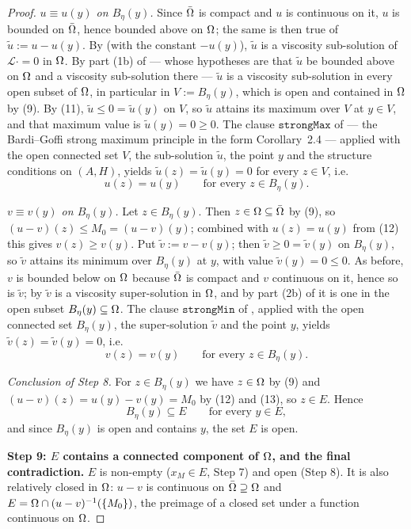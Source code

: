 \begin{proof}
\emph{$u\equiv u(y)$ on $B_\eta(y)$.} Since $\bar{\Omega}$ is compact and $u$ is continuous on it,
$u$ is bounded on $\bar{\Omega}$, hence bounded above on $\Omega$; the same is then true of
$\tilde u:=u-u(y)$. By  (with the constant $-u(y)$),
$\tilde u$ is a viscosity sub-solution of $\mathcal L\cdot=0$ in $\Omega$. By part (1b) of
 --- whose hypotheses are that $\tilde u$ be bounded above on
$\Omega$ and a viscosity sub-solution there --- $\tilde u$ is a viscosity sub-solution in every
open subset of $\Omega$, in particular in $V:=B_\eta(y)$, which is open and contained in $\Omega$
by (9). By (11), $\tilde u\le0=\tilde u(y)$ on $V$, so $\tilde u$ attains its maximum over
$V$ at $y\in V$, and that maximum value is $\tilde u(y)=0\ge0$. The clause
$\mathtt{strongMax}$ of  --- the Bardi--Goffi strong maximum principle
in the form Corollary~2.4 --- applied with the open connected set $V$, the sub-solution
$\tilde u$, the point $y$ and the structure conditions on $(A,H)$, yields
$\tilde u(z)=\tilde u(y)=0$ for every $z\in V$, i.e.
\[
 u(z)=u(y)\qquad\text{for every } z\in B_\eta(y). \tag{12}
\]

\emph{$v\equiv v(y)$ on $B_\eta(y)$.} Let $z\in B_\eta(y)$. Then $z\in\Omega\subseteq\bar{\Omega}$ by
(9), so $(u-v)(z)\le M_0=(u-v)(y)$; combined with $u(z)=u(y)$ from (12) this gives
$v(z)\ge v(y)$. Put $\tilde v:=v-v(y)$; then $\tilde v\ge0=\tilde v(y)$ on $B_\eta(y)$, so
$\tilde v$ attains its minimum over $B_\eta(y)$ at $y$, with value $\tilde v(y)=0\le0$.
As before, $v$ is bounded below on $\Omega$ because $\bar{\Omega}$ is compact and $v$ continuous on
it, hence so is $\tilde v$; by  $\tilde v$ is a viscosity
super-solution in $\Omega$, and by part (2b) of  it is one in the
open subset $B_\eta(y)\subseteq\Omega$. The clause $\mathtt{strongMin}$ of
, applied with the open connected set $B_\eta(y)$, the super-solution
$\tilde v$ and the point $y$, yields $\tilde v(z)=\tilde v(y)=0$, i.e.
\[
 v(z)=v(y)\qquad\text{for every } z\in B_\eta(y). \tag{13}
\]

\emph{Conclusion of Step 8.} For $z\in B_\eta(y)$ we have $z\in\Omega$ by (9) and
$(u-v)(z)=u(y)-v(y)=M_0$ by (12) and (13), so $z\in E$. Hence
\[
 B_\eta(y)\subseteq E\qquad\text{for every } y\in E, \tag{14}
\]
and since $B_\eta(y)$ is open and contains $y$, the set $E$ is open.

\medskip\noindent\textbf{Step 9: $E$ contains a connected component of $\Omega$, and the final
contradiction.} $E$ is non-empty ($x_M\in E$, Step 7) and open (Step 8). It is also
relatively closed in $\Omega$: $u-v$ is continuous on $\bar{\Omega}\supseteq\Omega$ and
$E=\Omega\cap(u-v)^{-1}(\{M_0\})$, the preimage of a closed set under a function continuous on
$\Omega$.


\end{proof}
